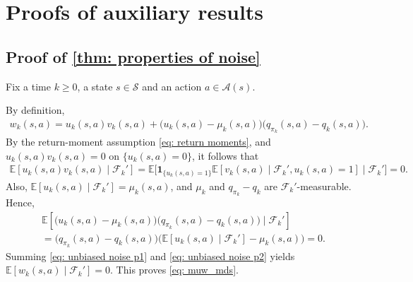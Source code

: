 \documentclass[twoside,11pt]{article}
\DeclareRobustCommand{\reviewbarstart}{%
  \ifhmode %
    \vadjust{\vbox to 0pt{%
      \vskip-\ht\strutbox %
      \vskip-\dp\strutbox %
      \cbstart[\changebarwidth] %
      \vss %
    }}%
  \else %
    \cbstart[\changebarwidth]%
  \fi %
} %
\providecommand{\DIFadd}[1]{#1} %
\providecommand{\DIFaddbegin}{\reviewbarstart} %
\providecommand{\DIFaddend}{\protect\cbend} %
\def\DIFadd#1{#1}%
\def\DIFaddbegin{}%
\def\DIFaddend{}%
\begin{document}
\clearpage


 \appendix
 \DIFaddbegin \section{\DIFadd{Proofs of auxiliary results}}
\DIFaddend \label{sec: Appendix}

\DIFaddbegin \subsection{\DIFadd{Proof of \autoref{thm: properties of noise}}}
\label{app: noise properties}
\DIFaddend 

 Fix a time $k\ge 0$, a state $s \in \mathcal S$ and an action $a \in \mathcal A(s)$.

By definition,
\begin{align}
\label{eq: noise def in appendix proof}
w_k(s,a) = u_k(s,a) v_k(s,a) + \big( u_k(s,a)-\mu_k(s,a) \big) \big( q_{\pi_k}(s,a) - q_k(s,a) \big).
\end{align}
 \DIFaddbegin \DIFadd{By the return-moment assumption \eqref{eq: return moments}}\DIFaddend ,
and $u_k(s,a) v_k(s,a) = 0$ on $\{u_k(s,a)=0\}$,
it follows that
 \DIFaddbegin \begin{align}
\DIFadd{\label{eq: unbiased noise p1}
\mathbb E}[ \DIFadd{u_k(s,a) v_k(s,a) \mid \mathcal F_k'}]
\DIFadd{=
\mathbb E \big[
    \mathbf 1_{\{u_k(s,a)=1\}} \mathbb E}[ \DIFadd{v_{k}(s,a) \mid \mathcal F_k', u_k(s,a)=1}]
    \DIFadd{\mid \mathcal F_k' \big]
= 0 .
}\end{align}\DIFaddend 
Also, $\mathbb E[u_k(s,a) \mid \mathcal F_k'] = \mu_k(s,a)$, and $\mu_k$ and $q_{\pi_k}-q_k$ are $\mathcal F_k'$-measurable. Hence,
\begin{multline}
\label{eq: unbiased noise p2}
\mathbb E \!\left[
\bigl( u_k(s,a)-\mu_k(s,a) \bigr) \bigl( q_{\pi_k}(s,a)-q_k(s,a) \bigr)
\mid \mathcal F_k'
\right]
\\
=
\big( q_{\pi_k}(s,a)-q_k(s,a) \big)
\big( \mathbb E\!\left[ u_k(s,a) \mid \mathcal F_k'
\right]
-\mu_k(s,a) \big)
=
0 .
\end{multline}
Summing \eqref{eq: unbiased noise p1} and \eqref{eq: unbiased noise p2} yields $\mathbb E[w_k(s,a) \mid \mathcal F_k'] = 0$.
 \DIFaddbegin \DIFadd{This proves \eqref{eq: muw_mds}.
}\DIFaddend 
\end{document}
